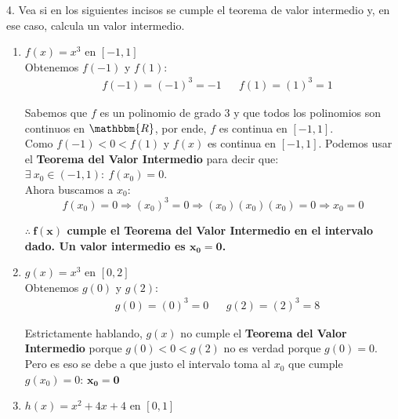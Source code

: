 \documentclass[12pt]{article}
\begin{document}
4. Vea si en los siguientes incisos se cumple el teorema de valor intermedio y, en ese caso, calcula un valor intermedio.

\begin{enumerate}[\hspace{9px} a)]
    \item \(f(x)=x^3\) en $[-1,1]$\\

        Obtenemos $f(-1)$ y $f(1)$:
        \begin{align*}
            &f(-1) = (-1)^3 = -1  &&f(1) = (1)^3 = 1
        \end{align*}

        Sabemos que $f$ es un polinomio de grado 3 y que todos los polinomios son continuos en $\mathbbm{R}$, por ende, $f$ es continua en $[-1,1]$.\\

        Como $f(-1) < 0 < f(1)$ y $f(x)$ es continua en $[-1,1]$. Podemos usar el \textbf{Teorema del Valor Intermedio} para decir que: \(\exists \ x_0 \in (-1,1) : \ f(x_0)=0\).\\

        Ahora buscamos a $x_0$:
        \begin{equation*}
            f(x_0)=0 \Rightarrow (x_0)^3 = 0 \Rightarrow (x_0)(x_0)(x_0)=0 \Rightarrow x_0=0
        \end{equation*}

        \textbf{$\mathbf{\therefore \ f(x)}$ cumple el Teorema del Valor Intermedio en el intervalo dado. Un valor intermedio es $\mathbf{x_0=0}$.}\\

    \item \(g(x)=x^3\) en $[0,2]$\\

        Obtenemos $g(0)$ y $g(2)$:
        \begin{align*}
            &g(0)=(0)^3=0 &&g(2)=(2)^3=8
        \end{align*}

        Estrictamente hablando, $g(x)$ no cumple el \textbf{Teorema del Valor Intermedio} porque \(g(0) < 0 < g(2)\) no es verdad porque $g(0)=0$. Pero es eso se debe a que justo el intervalo toma al $x_0$ que cumple $g(x_0)=0$: $\mathbf{x_0=0}$\\

    \item \(h(x)=x^2+4x+4\) en $[0,1]$\\


\end{enumerate}
\end{document}
